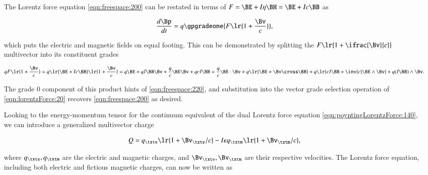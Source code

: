 %
%
The Lorentz force equation \cref{eqn:freespace:200}
can be restated
in terms of \( F = \BE + I \eta \BH = \BE + I c \BB \) as

\begin{dmath}\label{eqn:lorentzForce:20}
\frac{d\Bp}{dt} = q \gpgradeone{ F \lr{ 1 + \frac{\Bv}{c} } },
\end{dmath}

which puts the electric and magnetic fields on equal footing.
This can be demonstrated by splitting the \( F \lr{ 1 + \ifrac{\Bv}{c} } \) multivector into its constituent grades

\begin{dmath}\label{eqn:lorentzForce:40}
q F \lr{ 1 + \frac{\Bv}{c} }
=
q
\lr{ \BE + I c \BB }
\lr{ 1 + \frac{\Bv}{c} }
=
q \BE
+ q I \BB \Bv
+ \frac{q}{c} \BE \Bv
+ q c I \BB
=
  \frac{q}{c} \BE \cdot \Bv
+ q \lr{ \BE + \Bv \cross \BB }
+ q \lr{ c I \BB + \inv{c} \BE \wedge \Bv }
+ q (I \BB) \wedge \Bv.
\end{dmath}

The grade 0 component of this product hints of \cref{eqn:freespace:220}, and substitution into the vector grade selection operation of \cref{eqn:lorentzForce:20} recovers \cref{eqn:freespace:200} as desired.

Looking to the energy-momentum tensor for the continuum equivalent of the dual Lorentz force equation \cref{eqn:poyntingLorentzForce:140}, we can introduce a generalized multivector charge

\begin{dmath}\label{eqn:lorentzForce:240}
Q =
q_\txte \lr{ 1 + \Bv_\txte/c }
-I \epsilon q_\txtm \lr{ 1 + \Bv_\txtm/c },
\end{dmath}

where \( q_\txte, q_\txtm \) are the electric and magnetic charges, and \( \Bv_\txte, \Bv_\txtm \) are their respective velocities.
The Lorentz force equation, including both electric and fictious magnetic charges, can now be written as

